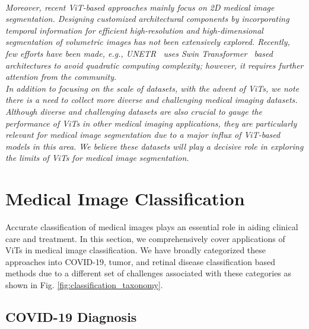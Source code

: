 \documentclass[10pt,journal,compsoc]{IEEEtran}
\begin{document}
\begin{tcolorbox}[top=0.5pt,left=0pt,size=minimal,boxrule = 0pt,breakable, enhanced]
{} \\
\vspace{0.01em}
\textit{ Moreover, recent ViT-based approaches mainly focus on 2D medical image segmentation. Designing customized architectural components by incorporating temporal information for efficient high-resolution and high-dimensional segmentation of volumetric images has not been extensively explored. Recently, few efforts have been made, e.g.,  UNETR~\cite{hatamizadeh2021unetr} uses Swin Transformer~\cite{liu2021swin} based architectures to avoid quadratic computing complexity; however, it requires further attention from the community. }
\\
\vspace{0.01em}
\textit{In addition to focusing on the scale of datasets,  %
with the advent of ViTs, we note there is a need to collect more diverse and challenging medical imaging datasets. Although diverse and challenging  datasets are also crucial to gauge the performance of ViTs in other medical imaging applications, they are particularly relevant for medical image segmentation due to a major influx of ViT-based models in this area. We believe these datasets will play a decisive role in exploring the limits of ViTs for medical image segmentation.}
\end{tcolorbox}

\section{Medical Image Classification} \label{sec:cla}

Accurate classification of medical images plays an essential role in aiding clinical care and treatment. In this section, we comprehensively cover applications of ViTs in medical image classification. 
We have broadly categorized these approaches into COVID-19, tumor, and retinal disease classification based methods due to a different set of challenges associated with these categories as shown in Fig. \ref{fig:classification_taxonomy}. 

\subsection{\textbf{COVID-19 Diagnosis}}
\end{document}
